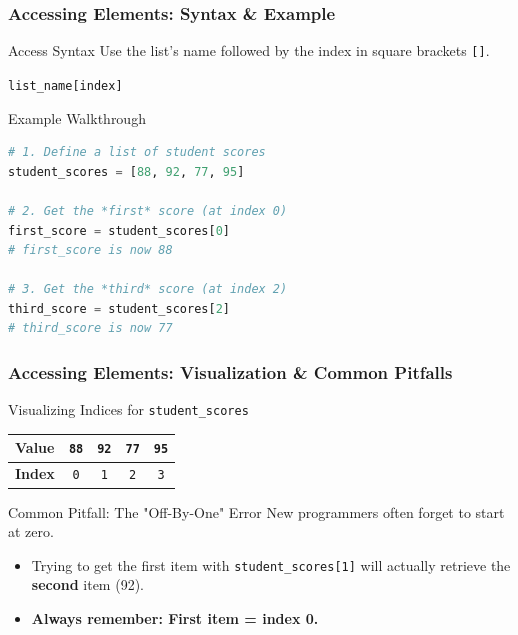 \documentclass{beamer}
\begin{document}
\begin{frame}[fragile]
    \frametitle{Accessing Elements: Syntax \& Example}

    \begin{block}{Access Syntax}
        Use the list's name followed by the index in square brackets \texttt{[]}.
        \begin{center}
            \texttt{list\_name[index]}
        \end{center}
    \end{block}

    \pause

    \begin{exampleblock}{Example Walkthrough}
\begin{lstlisting}[language=Python]
# 1. Define a list of student scores
student_scores = [88, 92, 77, 95]

# 2. Get the *first* score (at index 0)
first_score = student_scores[0]
# first_score is now 88

# 3. Get the *third* score (at index 2)
third_score = student_scores[2]
# third_score is now 77
\end{lstlisting}
    \end{exampleblock}

\end{frame}

\begin{frame}[fragile]
    \frametitle{Accessing Elements: Visualization \& Common Pitfalls}
    
    \begin{block}{Visualizing Indices for \texttt{student\_scores}}
        \centering
        \renewcommand{\arraystretch}{1.5}
        \begin{tabular}{|l|c|c|c|c|}
            \hline
            \textbf{Value} & \texttt{88} & \texttt{92} & \texttt{77} & \texttt{95} \\
            \hline
            \textbf{Index} & \texttt{0} & \texttt{1} & \texttt{2} & \texttt{3} \\
            \hline
        \end{tabular}
    \end{block}
    
    \pause
    
    \begin{alertblock}{Common Pitfall: The "Off-By-One" Error}
        New programmers often forget to start at zero.
        \begin{itemize}
            \item Trying to get the first item with \texttt{student\_scores[1]} will actually retrieve the \textbf{second} item (92).
            \item \textbf{Always remember: First item = index 0.}
        \end{itemize}
    \end{alertblock}
    
\end{frame}
\end{document}
